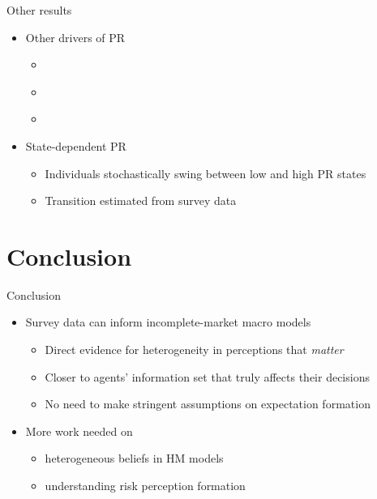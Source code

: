 \documentclass{beamer}
\begin{document}
\begin{frame}{Other results}
	
	\begin{itemize}
		\item Other drivers of PR
		\begin{itemize}
			\item \hyperlink{appendix:PR_macro_labor_market_correlation}{}
			\item \hyperlink{appendix:extrapolation}{}
			\item \hyperlink{appendix:experience}{}
		\end{itemize}
\item State-dependent PR 
\begin{itemize}
	\item Individuals stochastically swing between low and high PR states
	\item Transition estimated from survey data  \hyperlink{RegimeEstimation}{}
\end{itemize}

\end{itemize}
\end{frame}


\section{Conclusion}


\begin{frame}{Conclusion}
	
	\begin{itemize}
 	\item Survey data can inform incomplete-market macro models 
 	\begin{itemize}
 		\item Direct evidence for heterogeneity in perceptions that \textit{matter}
 		\item Closer to agents' information set that truly affects their decisions
 			\item No need to make stringent assumptions on expectation formation
 	\end{itemize}

	\item More work needed on 
	\begin{itemize}
		\item heterogeneous beliefs in HM models
		\item understanding risk perception formation  
	\end{itemize}
	\end{itemize}
\end{frame}
\end{document}
